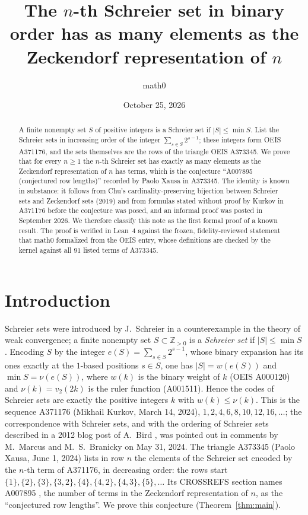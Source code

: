 \documentclass[11pt]{amsart}
\title[Row lengths of the Schreier-set triangle A373345]{The $n$-th Schreier set in binary order has as many elements as the Zeckendorf representation of $n$}
\author{math0}
\date{October 25, 2026}
\theoremstyle{plain}
\theoremstyle{definition}
\newcommand{\Z}{\mathbb{Z}}
\begin{document}
\begin{abstract}
A finite nonempty set $S$ of positive integers is a Schreier set if $|S|\le\min S$. List the Schreier sets in increasing order of the integer $\sum_{s\in S}2^{s-1}$; these integers form OEIS A371176, and the sets themselves are the rows of the triangle OEIS A373345.
We prove that for every $n\ge1$ the $n$-th Schreier set has exactly as many elements as the Zeckendorf representation of $n$ has terms, which is the conjecture ``A007895 (conjectured row lengths)'' recorded by Paolo Xausa in A373345.
The identity is known in substance: it follows from Chu's cardinality-preserving bijection between Schreier sets and Zeckendorf sets (2019) and from formulas stated without proof by Kurkov in A371176 before the conjecture was posed, and an informal proof was posted in September 2026. We therefore classify this note as the first formal proof of a known result.
The proof is verified in Lean~4 against the frozen, fidelity-reviewed statement that math0 formalized from the OEIS entry, whose definitions are checked by the kernel against all $91$ listed terms of A373345.
\end{abstract}
\maketitle

\section{Introduction}

Schreier sets were introduced by J.~Schreier \cite{Schreier} in a counterexample in the theory of weak convergence; a finite nonempty set $S\subset\Z_{>0}$ is a \emph{Schreier set} if $|S|\le\min S$.
Encoding $S$ by the integer $e(S)=\sum_{s\in S}2^{s-1}$, whose binary expansion has its ones exactly at the $1$-based positions $s\in S$, one has $|S|=w(e(S))$ and $\min S=\nu(e(S))$, where $w(k)$ is the binary weight of $k$ (OEIS A000120) and $\nu(k)=v_2(2k)$ is the ruler function (A001511).
Hence the codes of Schreier sets are exactly the positive integers $k$ with $w(k)\le\nu(k)$. This is the sequence A371176 \cite{A371176} (Mikhail Kurkov, March 14, 2024), $1,2,4,6,8,10,12,16,\dots$; the correspondence with Schreier sets, and with the ordering of Schreier sets described in a 2012 blog post of A.~Bird \cite{Bird}, was pointed out in comments by M.~Marcus and M.~S.~Branicky on May 31, 2024.
The triangle A373345 \cite{A373345} (Paolo Xausa, June 1, 2024) lists in row $n$ the elements of the Schreier set encoded by the $n$-th term of A371176, in decreasing order: the rows start $\{1\},\{2\},\{3\},\{3,2\},\{4\},\{4,2\},\{4,3\},\{5\},\dots$
Its CROSSREFS section names A007895 \cite{A007895}, the number of terms in the Zeckendorf representation of $n$, as the ``conjectured row lengths''. We prove this conjecture (Theorem~\ref{thm:main}).
\end{document}
